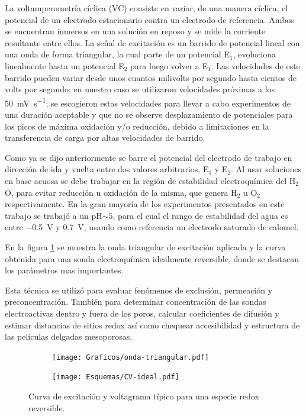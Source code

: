 	 		La voltamperometría cíclica (VC) consiste en variar, de una manera cíclica, el potencial de un electrodo estacionario contra un electrodo de referencia. Ambos se encuentran inmersos en una solución en reposo y se mide la corriente resultante entre ellos. La señal de excitación es un barrido de potencial lineal con una onda de forma triangular, la cual parte de un potencial E$_1$, evoluciona linealmente hasta un potencial E$_2$ para luego volver a E$_1$. Las velocidades de este barrido pueden variar desde unos cuantos milivolts por segundo hasta cientos de volts por segundo; en nuestro caso se utilizaron velocidades próximas a los \SI{50}{\milli\volt.\second^{-1}}; se escogieron estas velocidades para llevar a cabo experimentos de una duración aceptable y que no se observe desplazamiento de potenciales para los picos de máxima oxidación y/o reducción, debido a limitaciones en la transferencia de carga por altas velocidades de barrido. \cite{nicholson1964,Gewirth2004}

	 		Como ya se dijo anteriormente se barre el potencial del electrodo de trabajo en dirección de ida y vuelta entre dos valores arbitrarios, E$_1$ y E$_2$. Al usar soluciones en base acuosa se debe trabajar en la región de estabilidad electroquímica del H$_2$O, para evitar reducción u oxidación de la misma, que genera H$_2$ u O$_2$ respectivamente. En la gran mayoría de los experimentos presentados en este trabajo se trabajó a un pH$\sim 5$, para el cual el rango de estabilidad del agua es entre \SI{-0.5}{\volt} y \SI{0.7}{\volt}, usando como referencia un electrodo saturado de calomel.\cite{wang2014} 

	 		En la figura \ref{fig:CV_ideal} se muestra la onda triangular de excitación aplicada y la curva obtenida para una sonda electroquímica idealmente reversible, donde se destacan los parámetros mas importantes.
	 		
	 		Esta técnica se utilizó para evaluar fenómenos de exclusión, permeación y preconcentración. También para determinar concentración de las sondas electroactivas dentro y fuera de los poros, calcular coeficientes de difusión y estimar distancias de sitios redox así como chequear accesibilidad y estructura de las películas delgadas mesoporosas.

	 			 \begin{figure}[h!]
			  		  \begin{subfigure}[t]{0.495\textwidth}
			  		  \texttt{[image: Graficos/onda-triangular.pdf]}
			  		  \end{subfigure}
			  		  \begin{subfigure}[t]{0.495\textwidth}
			  		  \texttt{[image: Esquemas/CV-ideal.pdf]}
			  		  \end{subfigure}
			  		  \caption[Voltamperometria ideal reversible]{Curva de excitación y voltagrama típico para una especie redox reversible.}
			  		  \label{fig:CV_ideal}
			  		  \end{figure}

